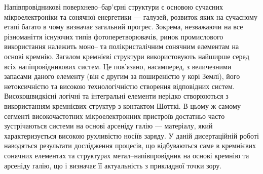 %
%
%
%
%
%
%
%
%
%

{\actualityTXT}
Напівпровідникові поверхнево--бар'єрні структури є основою сучасних мікроелектроніки та сонячної енергетики --- галузей, розвиток яких на сучасному етапі багато в чому визначає загальний прогрес.
Зокрема, незважаючи на все різноманіття існуючих типів фотоперетворювачів, ринок промислового використання належить моно-- та полікристалічним сонячним елементам на основі кремнію.
Загалом кремнієві структури використовують найширше серед всіх напіпровідникових систем.
Це пов'язано, насамперед, з величезними запасами даного елементу (він є другим за поширеністю у корі Землі), його нетоксичністю та високою технологічністю створення відповідних систем.
Високошвидкісні логічні та інтегральні елементи нерідко створюються з використанням кремнієвих структур з контактом Шотткі.
В цьому ж самому сегменті високочастотних мікроелектронних пристроїв достатньо часто зустрічаються системи на основі арсеніду галію --- матеріалу, який характеризується високою рухливістю носіїв заряду.
У даній дисертаційній роботі наводяться результати дослідження процесів, що відбуваються саме в кремнієвих сонячних елементах та структурах метал--напівпровідник на основі кремнію та арсеніду галію, що і визначає її актуальність з прикладної точки зору.


